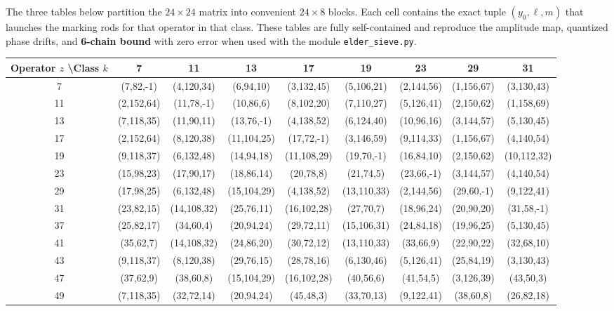 \documentclass[11pt,a4paper]{article}
\begin{document}
The three tables below partition the \(24 \times 24\) matrix into convenient \(24 \times 8\) blocks. Each cell contains the exact tuple \((y_0, \ell, m)\) that launches the marking rods for that operator in that class. These tables are fully self-contained and reproduce the amplitude map, quantized phase drifts, and \textbf{6-chain bound }with zero error when used with the module \texttt{elder\_sieve.py}.

\begin{table}[htbp]
\centering
\tiny
\begin{tabular}{c|cccccccc}
Operator \(z\) \textbackslash Class \(k\) & 7 & 11 & 13 & 17 & 19 & 23 & 29 & 31 \\
\hline
7  & (7,82,-1) & (4,120,34) & (6,94,10) & (3,132,45) & (5,106,21) & (2,144,56) & (1,156,67) & (3,130,43) \\
11 & (2,152,64) & (11,78,-1) & (10,86,6) & (8,102,20) & (7,110,27) & (5,126,41) & (2,150,62) & (1,158,69) \\
13 & (7,118,35) & (11,90,11) & (13,76,-1) & (4,138,52) & (6,124,40) & (10,96,16) & (3,144,57) & (5,130,45) \\
17 & (2,152,64) & (8,120,38) & (11,104,25) & (17,72,-1) & (3,146,59) & (9,114,33) & (1,156,67) & (4,140,54) \\
19 & (9,118,37) & (6,132,48) & (14,94,18) & (11,108,29) & (19,70,-1) & (16,84,10) & (2,150,62) & (10,112,32) \\
23 & (15,98,23) & (17,90,17) & (18,86,14) & (20,78,8) & (21,74,5) & (23,66,-1) & (3,144,57) & (4,140,54) \\
29 & (17,98,25) & (6,132,48) & (15,104,29) & (4,138,52) & (13,110,33) & (2,144,56) & (29,60,-1) & (9,122,41) \\
31 & (23,82,15) & (14,108,32) & (25,76,11) & (16,102,28) & (27,70,7) & (18,96,24) & (20,90,20) & (31,58,-1) \\
37 & (25,82,17) & (34,60,4) & (20,94,24) & (29,72,11) & (15,106,31) & (24,84,18) & (19,96,25) & (5,130,45) \\
41 & (35,62,7) & (14,108,32) & (24,86,20) & (30,72,12) & (13,110,33) & (33,66,9) & (22,90,22) & (32,68,10) \\
43 & (9,118,37) & (8,120,38) & (29,76,15) & (28,78,16) & (6,130,46) & (5,126,41) & (25,84,19) & (3,130,43) \\
47 & (37,62,9) & (38,60,8) & (15,104,29) & (16,102,28) & (40,56,6) & (41,54,5) & (3,126,39) & (43,50,3) \\
49 & (7,118,35) & (32,72,14) & (20,94,24) & (45,48,3) & (33,70,13) & (9,122,41) & (38,60,8) & (26,82,18) \\

\end{tabular}
\end{table}
\end{document}
